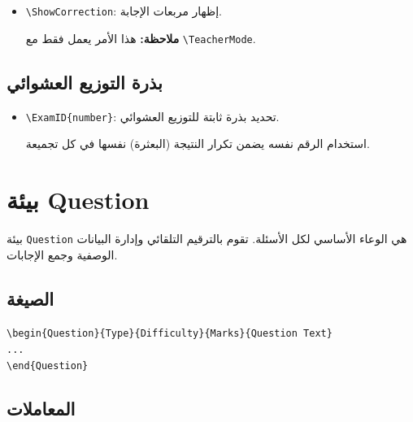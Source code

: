 \documentclass[a4paper]{article}
\newcommand{\engtt}[1]{\textenglish{\texttt{#1}}}
\begin{document}
\begin{itemize}
    \item \engtt{\textbackslash ShowCorrection}: إظهار مربعات الإجابة.\par
          \textbf{ملاحظة:} هذا الأمر يعمل فقط مع \engtt{\textbackslash TeacherMode}.
\end{itemize}

\subsection*{بذرة التوزيع العشوائي}

\begin{itemize}
    \item \engtt{\textbackslash ExamID\{number\}}: تحديد بذرة ثابتة للتوزيع العشوائي.\par
          استخدام الرقم نفسه يضمن تكرار النتيجة (البعثرة) نفسها في كل تجميعة.
\end{itemize}

\section{بيئة Question}

بيئة \engtt{Question} هي الوعاء الأساسي لكل الأسئلة. تقوم بالترقيم التلقائي وإدارة البيانات الوصفية وجمع الإجابات.

\subsection*{الصيغة}

\begin{LTR}\ttfamily
\verb|\begin{Question}{Type}{Difficulty}{Marks}{Question Text}|\\
\verb|...|\quad{}\\
\verb|\end{Question}|
\end{LTR}

\subsection*{المعاملات}
\end{document}
